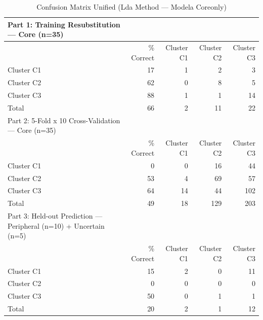 \begin{table}[htbp]
  \centering
  \caption{Confusion Matrix Unified (Lda Method — Modela Coreonly)}
  \label{tab:LDA_Method_ModelA_CoreOnly_tables_confusion_matrix_unified}
  \begin{tabular}{lrrrr}
    \toprule
    Part 1: Training Resubstitution — Core (n=35) &  &  &  &  \\
    \midrule
     & \% Correct & Cluster C1 & Cluster C2 & Cluster C3 \\
    Cluster C1 & 17 & 1 & 2 & 3 \\
    Cluster C2 & 62 & 0 & 8 & 5 \\
    Cluster C3 & 88 & 1 & 1 & 14 \\
    Total & 66 & 2 & 11 & 22 \\
    Part 2: 5-Fold x 10 Cross-Validation — Core (n=35) &  &  &  &  \\
     & \% Correct & Cluster C1 & Cluster C2 & Cluster C3 \\
    Cluster C1 & 0 & 0 & 16 & 44 \\
    Cluster C2 & 53 & 4 & 69 & 57 \\
    Cluster C3 & 64 & 14 & 44 & 102 \\
    Total & 49 & 18 & 129 & 203 \\
    Part 3: Held-out Prediction — Peripheral (n=10) + Uncertain (n=5) &  &  &  &  \\
     & \% Correct & Cluster C1 & Cluster C2 & Cluster C3 \\
    Cluster C1 & 15 & 2 & 0 & 11 \\
    Cluster C2 & 0 & 0 & 0 & 0 \\
    Cluster C3 & 50 & 0 & 1 & 1 \\
    Total & 20 & 2 & 1 & 12 \\
    \bottomrule
  \end{tabular}
\end{table}
